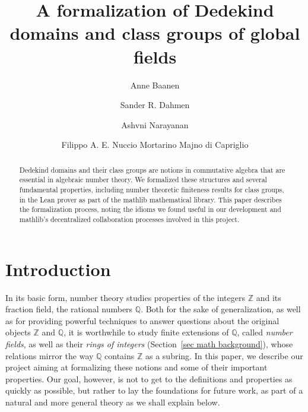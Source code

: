 \documentclass[a4paper,USenglish,cleveref, autoref, thm-restate]{lipics-v2021}
\title{A formalization of Dedekind domains and class groups of global fields}
\author{Anne Baanen}{Department of Computer Science, Vrije Universiteit Amsterdam, The Netherlands \and \url{https://cs.vu.nl/~tbn305}}{t.baanen@vu.nl}{https://orcid.org/0000-0001-8497-3683}
{NWO Vidi grant No.\ 016.Vidi.189.037, Lean Forward}
\author{Sander R. Dahmen}{Department of Mathematics, Vrije Universiteit Amsterdam, The Netherlands \and \url{https://few.vu.nl/~sdn249/}}{s.r.dahmen@vu.nl}{https://orcid.org/0000-0002-0014-0789}{NWO Vidi grant No.\ 639.032.613, New Diophantine Directions}
\author{Ashvni Narayanan}{London School of Geometry and Number Theory}{a.narayanan20@imperial.ac.uk}{https://orcid.org/0000-0003-2777-4228}{EPSRC Grant EP/S021590/1 (UK)}
\author{Filippo A. E. Nuccio Mortarino Majno di Capriglio}{Univ Lyon, Université Jean Monnet Saint-Étienne, CNRS UMR 5208, Institut Camille Jordan, F-42023 Saint-\'Etienne, France\and\url {https://perso.univ-st-etienne.fr/nf51454h/index.html}}{filippo.nuccio@univ-st-etienne.fr}{https://orcid.org/0000-0002-5318-9869}{\empty}
\newcommand{\mathlib}{\textsf{mathlib}\xspace}
\newcommand{\Q}{\mathbb{Q}}
\newcommand{\Z}{\mathbb{Z}}
\begin{document}
\maketitle

\begin{abstract}
Dedekind domains and their class groups are notions in commutative algebra that are essential in algebraic number theory.
We formalized these structures and several fundamental properties, including number theoretic finiteness results for class groups, in the Lean prover as part of the \mathlib mathematical library.
This paper describes the formalization process, noting the idioms we found useful in our development and \mathlib's decentralized collaboration processes involved in this project.
\end{abstract}

\section{Introduction}

In its basic form, number theory studies properties of the integers $\Z$
and its fraction field, the rational numbers $\Q$. %
Both for the sake of generalization, as well as for providing powerful techniques to answer questions about the original objects $\Z$ and $\Q$,
it is worthwhile to study finite extensions of $\Q$, called \emph{number fields}, as well as their \emph{rings of integers} (Section~\ref{sec math background}),
whose relations mirror the way $\Q$ contains $\Z$ as a subring.
In this paper, we describe our project aiming at formalizing these notions and some of their important properties. Our goal, however, is not to get to the definitions and properties as quickly as possible,
but rather %
to lay the foundations for future work,
as part of a natural and more general theory as we shall explain below.
\end{document}
